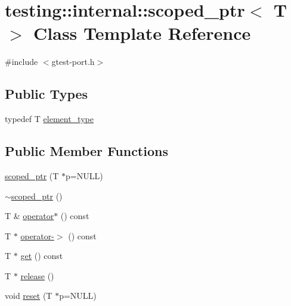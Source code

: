 \hypertarget{classtesting_1_1internal_1_1scoped__ptr}{\section{testing\+:\+:internal\+:\+:scoped\+\_\+ptr$<$ T $>$ Class Template Reference}
\label{classtesting_1_1internal_1_1scoped__ptr}
}


{\ttfamily \#include $<$gtest-\/port.\+h$>$}

\subsection*{Public Types}
\begin{DoxyCompactItemize}
\item 
typedef T \hyperlink{classtesting_1_1internal_1_1scoped__ptr_ae755ffeebada8e20b68c1d1ffa91cf13}{element\+\_\+type}
\end{DoxyCompactItemize}
\subsection*{Public Member Functions}
\begin{DoxyCompactItemize}
\item 
\hyperlink{classtesting_1_1internal_1_1scoped__ptr_adb972432999a0c63720df148964ac2a5}{scoped\+\_\+ptr} (T $\ast$p=N\+U\+L\+L)
\item 
\hyperlink{classtesting_1_1internal_1_1scoped__ptr_ab721de9bf4369f002fb563e82352ee36}{$\sim$scoped\+\_\+ptr} ()
\item 
T \& \hyperlink{classtesting_1_1internal_1_1scoped__ptr_ab197837f87062de69d9d6e04539bbabe}{operator$\ast$} () const 
\item 
T $\ast$ \hyperlink{classtesting_1_1internal_1_1scoped__ptr_adc38310fbbe400faf9279e36000a17c4}{operator-\/$>$} () const 
\item 
T $\ast$ \hyperlink{classtesting_1_1internal_1_1scoped__ptr_adc8f8fcb63ce69f80f011456e6d2f08d}{get} () const 
\item 
T $\ast$ \hyperlink{classtesting_1_1internal_1_1scoped__ptr_a7a4f3e568d81a5d8bcb5f8d6bf5130b1}{release} ()
\item 
void \hyperlink{classtesting_1_1internal_1_1scoped__ptr_acac03266a43359801aff0de5c990bec0}{reset} (T $\ast$p=N\+U\+L\+L)
\end{DoxyCompactItemize}


